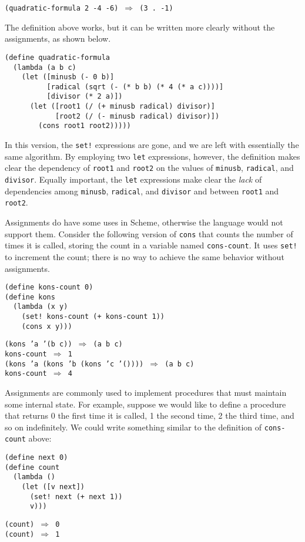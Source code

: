 \texttt{(quadratic-formula 2 -4 -6) \(\Rightarrow\) (3 . -1)}

The definition above works, but it can be written more clearly without the
assignments, as shown below.


\begin{alltt}
(define quadratic-formula
  (lambda (a b c)
    (let ([minusb (- 0 b)]
          [radical (sqrt (- (* b b) (* 4 (* a c))))]
          [divisor (* 2 a)])
      (let ([root1 (/ (+ minusb radical) divisor)]
            [root2 (/ (- minusb radical) divisor)])
        (cons root1 root2)))))
\end{alltt}


In this version, the \texttt{set!} expressions are gone, and we are left with
essentially the same algorithm.
By employing two \texttt{let} expressions, however, the definition makes
clear the dependency of \texttt{root1} and \texttt{root2} on the values of
\texttt{minusb}, \texttt{radical}, and \texttt{divisor}.
Equally important, the \texttt{let} expressions make clear the \textit{lack} of
dependencies among \texttt{minusb}, \texttt{radical}, and \texttt{divisor} and
between \texttt{root1} and \texttt{root2}.


Assignments do have some uses in Scheme, otherwise the language
would not support them.
Consider the following version of \texttt{cons} that counts the number of times
it is called, storing the count in a variable named \texttt{cons-count}.
It uses \texttt{set!} to increment the count; there is no way to achieve the
same behavior without assignments.


\begin{alltt}
(define kons-count 0)
(define kons
  (lambda (x y)
    (set! kons-count (+ kons-count 1))
    (cons x y)))

(kons 'a '(b c)) \(\Rightarrow\) (a b c)
kons-count \(\Rightarrow\) 1
(kons 'a (kons 'b (kons 'c '()))) \(\Rightarrow\) (a b c)
kons-count \(\Rightarrow\) 4
\end{alltt}


Assignments are commonly used to implement procedures that must maintain
some \label{start_s167}internal state.
For example, suppose we would like to define a procedure that returns
0 the first time it is called, 1 the second time, 2 the third time,
and so on indefinitely.
We could write something similar to the definition of \texttt{cons-count}
above:


\begin{alltt}
(define next 0)
(define count
  (lambda ()
    (let ([v next])
      (set! next (+ next 1))
      v)))

(count) \(\Rightarrow\) 0
(count) \(\Rightarrow\) 1
\end{alltt}


